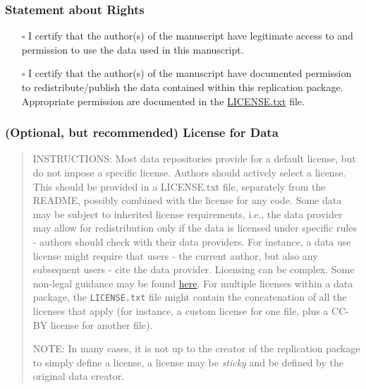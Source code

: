 \documentclass[
]{article}
\providecommand{\tightlist}{%
  \setlength{\itemsep}{0pt}\setlength{\parskip}{0pt}}
\begin{document}
\hypertarget{statement-about-rights}{%
\subsubsection{Statement about Rights}\label{statement-about-rights}}

\begin{itemize}
\tightlist
\item[$\square$]
  I certify that the author(s) of the manuscript have legitimate access
  to and permission to use the data used in this manuscript.
\item[$\square$]
  I certify that the author(s) of the manuscript have documented
  permission to redistribute/publish the data contained within this
  replication package. Appropriate permission are documented in the
  \href{https://social-science-data-editors.github.io/template_README/LICENSE.txt}{LICENSE.txt}
  file.
\end{itemize}

\hypertarget{optional-but-recommended-license-for-data}{%
\subsubsection{(Optional, but recommended) License for
Data}\label{optional-but-recommended-license-for-data}}

\begin{quote}
INSTRUCTIONS: Most data repositories provide for a default license, but
do not impose a specific license. Authors should actively select a
license. This should be provided in a LICENSE.txt file, separately from
the README, possibly combined with the license for any code. Some data
may be subject to inherited license requirements, i.e., the data
provider may allow for redistribution only if the data is licensed under
specific rules - authors should check with their data providers. For
instance, a data use license might require that users - the current
author, but also any subsequent users - cite the data provider.
Licensing can be complex. Some non-legal guidance may be found
\href{https://social-science-data-editors.github.io/guidance/Licensing_guidance.html}{here}.
For multiple licenses within a data package, the \texttt{LICENSE.txt}
file might contain the concatenation of all the licenses that apply (for
instance, a custom license for one file, plus a CC-BY license for
another file).

NOTE: In many cases, it is not up to the creator of the replication
package to simply define a license, a license may be \emph{sticky} and
be defined by the original data creator.
\end{quote}
\end{document}
